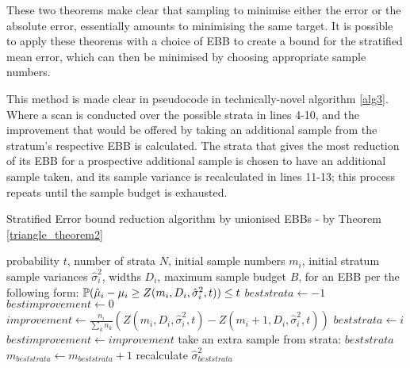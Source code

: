 These two theorems make clear that sampling to minimise either the error or the absolute error, essentially amounts to minimising the same target.
It is possible to apply these theorems with a choice of EBB to create a bound for the stratified mean error, which can then be minimised by choosing appropriate sample numbers.

This method is made clear in pseudocode in technically-novel algorithm \ref{alg3}.
Where a scan is conducted over the possible strata in lines 4-10, and the improvement that would be offered by taking an additional sample from the stratum's respective EBB is calculated.
The strata that gives the most reduction of its EBB for a prospective additional sample is chosen to have an additional sample taken, and its sample variance is recalculated in lines 11-13; this process repeats until the sample budget is exhausted.

\begin{algorithm}
\caption[Stratified Error bound reduction algorithm by unionised EBBs]{Stratified Error bound reduction algorithm by unionised EBBs - by Theorem \ref{triangle_theorem2}}
\label{alg3}
\begin{algorithmic}[1]
    \REQUIRE probability $t$, number of strata $N$, initial sample numbers $m_i$, initial stratum sample variances $\hat{\sigma}_i^2$, widths $D_i$, maximum sample budget $B$,
    for an EBB per the following form: $\operatorname{\mathbb{P}}(\hat{\mu}_i-\mu_i \ge Z(m_i,D_i,\hat{\sigma}^2_i,t)) \le t $
        \STATE $beststrata \leftarrow -1$
        \STATE $bestimprovement \leftarrow 0$
    		\STATE $improvement \leftarrow \frac{n_i}{\sum_kn_k}\left(Z(m_i,D_i,\hat{\sigma}^2_i,t) - Z(m_i+1,D_i,\hat{\sigma}^2_i,t)\right)$
    	        \STATE $beststrata \leftarrow i$
    	        \STATE $bestimprovement \leftarrow improvement$
    	    \ENDIF
    	\ENDFOR
    	\STATE take an extra sample from strata: $beststrata$
	    \STATE $m_{beststrata} \leftarrow m_{beststrata} + 1$
    	\STATE recalculate $\hat{\sigma}_{beststrata}^2$
    \ENDWHILE
\end{algorithmic}
\end{algorithm}

